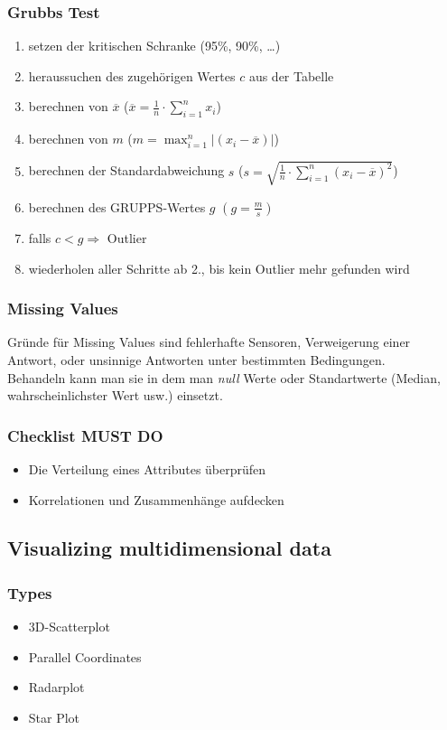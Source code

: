 \documentclass[a4paper]{scrartcl}
\begin{document}
\subsubsection{Grubbs Test}
\begin{enumerate}
	\setlength{\parskip}{-1pt}
	\item setzen der kritischen Schranke (95\%, 90\%, \dots)
	\item heraussuchen des zugehörigen Wertes $c$ aus der Tabelle
	\item berechnen von $\overline{x}$ ($\overline{x}=\frac{1}{n} \cdot \sum\limits_{i=1}^{n} x_i$)
	\item berechnen von $m$ ($m=\max_{i=1}^n |(x_i - \overline{x})|$)
	\item berechnen der Standardabweichung $s$ ($s=\sqrt{\frac{1}{n}\cdot \sum\limits_{i=1}^{n}(x_i-\overline{x})^2}$)
	\item berechnen des GRUPPS-Wertes $g$  $(g=\frac{m}{s})$
	\item falls $c<g \Rightarrow$ Outlier
	\item wiederholen aller Schritte ab 2., bis kein Outlier mehr gefunden wird
\end{enumerate}

\subsubsection{Missing Values}
Gründe für Missing Values sind fehlerhafte Sensoren, Verweigerung einer Antwort, oder unsinnige Antworten unter bestimmten Bedingungen.\\
Behandeln kann man sie in dem man \textit{null} Werte oder Standartwerte (Median, wahrscheinlichster Wert usw.) einsetzt.
\subsubsection{Checklist MUST DO}
\begin{itemize}
\setlength{\parskip}{-1pt}
\item Die Verteilung eines Attributes überprüfen
\item Korrelationen und Zusammenhänge aufdecken
\end{itemize}

\subsection{Visualizing multidimensional data}
\subsubsection{Types}
\begin{itemize}
\setlength{\parskip}{-1pt}
\item 3D-Scatterplot
\item Parallel Coordinates
\item Radarplot
\item Star Plot 
\end{itemize}
\end{document}
